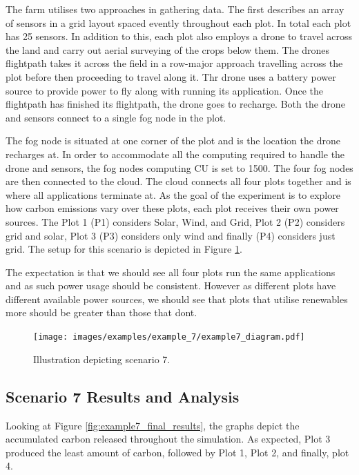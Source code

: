 \documentclass{l4proj}
\begin{document}
The farm utilises two approaches in gathering data.
The first describes an array of sensors in a grid layout spaced evently throughout each plot.
In total each plot has 25 sensors.
In addition to this, each plot also employs a drone to travel across the land and carry out aerial surveying of the crops below them.
The drones flightpath takes it across the field in a row-major approach travelling across the plot before then proceeding to travel along it.
Thr drone uses a battery power source to provide power to fly along with running its application.
Once the flightpath has finished its flightpath, the drone goes to recharge.
Both the drone and sensors connect to a single fog node in the plot.

The fog node is situated at one corner of the plot and is the location the drone recharges at.
In order to accommodate all the computing required to handle the drone and sensors, the fog nodes computing CU is set to 1500.
The four fog nodes are then connected to the cloud.
The cloud connects all four plots together and is where all applications terminate at.
As the goal of the experiment is to explore how carbon emissions vary over these plots, each plot receives their own power sources.
The Plot 1 (P1) considers Solar, Wind, and Grid, Plot 2 (P2) considers grid and solar, Plot 3 (P3) considers only wind and finally (P4) considers just grid.
The setup for this scenario is depicted in Figure \ref{fig:example7_diagram}.

The expectation is that we should see all four plots run the same applications and as such power usage should be consistent.
However as different plots have different available power sources, we should see that plots that utilise renewables more should be greater than those that dont.

\begin{figure}[h]
    \centering
    \texttt{[image: images/examples/example\_7/example7\_diagram.pdf]}
    ~
    \caption{Illustration depicting scenario 7.}
    \label{fig:example7_diagram}
\end{figure}

\subsection{Scenario 7 Results and Analysis}
Looking at Figure \ref{fig:example7_final_results}, the graphs depict the accumulated carbon released throughout the simulation.
As expected, Plot 3 produced the least amount of carbon, followed by Plot 1, Plot 2, and finally, plot 4.
\end{document}
